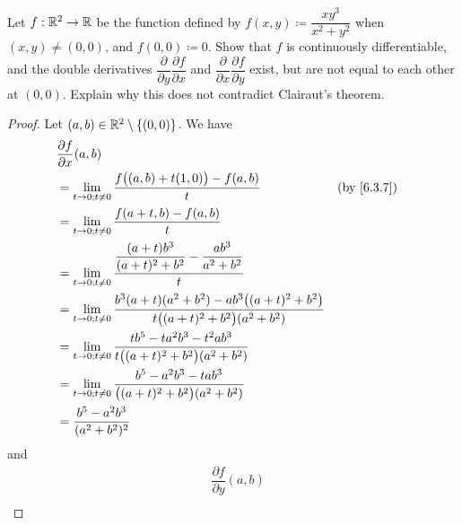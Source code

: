 \exercisesection

\begin{ex}\label{ex:6.5.1}
  Let \(f : \mathbb{R}^2 \to \mathbb{R}\) be the function defined by \(f(x, y) \coloneqq \dfrac{x y^3}{x^2 + y^2}\) when \((x, y) \neq (0, 0)\), and \(f(0, 0) \coloneqq 0\).
  Show that \(f\) is continuously differentiable, and the double derivatives \(\dfrac{\partial}{\partial y} \dfrac{\partial f}{\partial x}\) and \(\dfrac{\partial}{\partial x} \dfrac{\partial f}{\partial y}\) exist, but are not equal to each other at \((0, 0)\).
  Explain why this does not contradict Clairaut's theorem.
\end{ex}

\begin{proof}
  Let \((a, b) \in \mathbb{R}^2 \setminus \left\lbrace(0, 0)\right\rbrace\).
  We have
  \begin{align*}
     & \dfrac{\partial f}{\partial x}(a, b)                                                                                                                   \\
     & = \lim_{t \to 0 ; t \neq 0} \dfrac{f\big((a, b) + t(1, 0)\big) - f(a, b)}{t}                                                           &  & \by{6.3.7} \\
     & = \lim_{t \to 0 ; t \neq 0} \dfrac{f(a + t, b) - f(a, b)}{t}                                                                                           \\
     & = \lim_{t \to 0 ; t \neq 0} \dfrac{\dfrac{(a + t) b^3}{(a + t)^2 + b^2} - \dfrac{ab^3}{a^2 + b^2}}{t}                                                  \\
     & = \lim_{t \to 0 ; t \neq 0} \dfrac{b^3 (a + t) (a^2 + b^2) - a b^3 \big((a + t)^2 + b^2\big)}{t \big((a + t)^2 + b^2\big) (a^2 + b^2)}                 \\
     & = \lim_{t \to 0 ; t \neq 0} \dfrac{t b^5 - t a^2 b^3 - t^2 a b^3}{t \big((a + t)^2 + b^2\big) (a^2 + b^2)}                                             \\
     & = \lim_{t \to 0 ; t \neq 0} \dfrac{b^5 - a^2 b^3 - t a b^3}{\big((a + t)^2 + b^2\big) (a^2 + b^2)}                                                     \\
     & = \dfrac{b^5 - a^2 b^3}{(a^2 + b^2)^2}
  \end{align*}
  and
  \begin{align*}
     & \dfrac{\partial f}{\partial y}(a, b)                                                                                                                     \\

\end{align*}
\end{proof}
